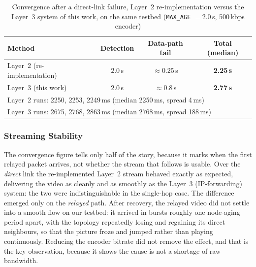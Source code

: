 \begin{table}[H]
\centering
\caption{Convergence after a direct-link failure, Layer~2 re-implementation
versus the Layer~3 system of this work, on the same testbed
(\texttt{MAX\_AGE} $= 2.0$\,s, 500\,kbps encoder)}
\label{tab:l2-conv}
\begin{tabular}{lccc}
\toprule
\textbf{Method} & \textbf{Detection} & \textbf{Data-path tail} & \textbf{Total (median)} \\
\midrule
Layer~2 (re-implementation) & $2.0$\,s & $\approx 0.25$\,s & \textbf{2.25\,s} \\
Layer~3 (this work)         & $2.0$\,s & $\approx 0.8$\,s  & \textbf{2.77\,s} \\
\midrule
\multicolumn{4}{l}{Layer~2 runs: 2250, 2253, 2249\,ms \quad (median 2250\,ms, spread 4\,ms)} \\
\multicolumn{4}{l}{Layer~3 runs: 2675, 2768, 2863\,ms \quad (median 2768\,ms, spread 188\,ms)} \\
\bottomrule
\end{tabular}
\end{table}

\subsubsection{Streaming Stability}

The convergence figure tells only half of the
story, because it marks when the first relayed packet arrives, not whether the
stream that follows is usable. Over the \emph{direct} link the
re-implemented Layer~2 stream behaved exactly as expected, delivering the video
as cleanly and as smoothly as the Layer~3 (IP-forwarding) system: the two were
indistinguishable in the single-hop case. The difference emerged only on the
\emph{relayed} path. After recovery, the relayed video did not settle into a
smooth flow on our testbed: it arrived in bursts roughly one node-aging period
apart, with the topology repeatedly losing and regaining its direct neighbours,
so that the picture froze and jumped rather than playing continuously. Reducing
the encoder bitrate did not remove the effect, and that is the key observation,
because it shows the cause is not a shortage of raw bandwidth.

